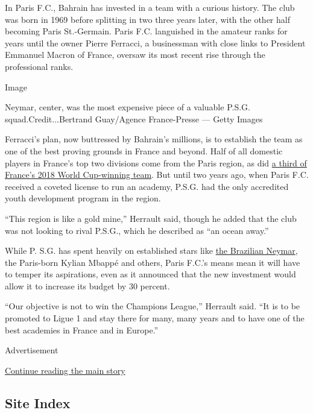 In Paris F.C., Bahrain has invested in a team with a curious history.
The club was born in 1969 before splitting in two three years later,
with the other half becoming Paris St.-Germain. Paris F.C. languished in
the amateur ranks for years until the owner Pierre Ferracci, a
businessman with close links to President Emmanuel Macron of France,
oversaw its most recent rise through the professional ranks.

Image

Neymar, center, was the most expensive piece of a valuable P.S.G.
squad.Credit...Bertrand Guay/Agence France-Presse --- Getty Images

Ferracci's plan, now buttressed by Bahrain's millions, is to establish
the team as one of the best proving grounds in France and beyond. Half
of all domestic players in France's top two divisions come from the
Paris region, as did
\href{https://www.nytimes3xbfgragh.onion/2018/06/07/sports/soccer/france-world-cup-kylian-mbappe.html\#:~:text=Of\%20the\%2023\%20players\%20whom,Presnel\%20Kimpembe\%20and\%20Steven\%20Nzonzi.}{a
third of France's 2018 World Cup-winning team}. But until two years ago,
when Paris F.C. received a coveted license to run an academy, P.S.G. had
the only accredited youth development program in the region.

``This region is like a gold mine,'' Herrault said, though he added that
the club was not looking to rival P.S.G., which he described as ``an
ocean away.''

While P. S.G. has spent heavily on established stars like
\href{https://www.nytimes3xbfgragh.onion/2017/07/26/sports/soccer/at-psg-price-for-neymar-and-elusive-success-might-be-worth-it.html}{the
Brazilian Neymar}, the Paris-born Kylian Mbappé and others, Paris F.C.'s
means mean it will have to temper its aspirations, even as it announced
that the new investment would allow it to increase its budget by 30
percent.

``Our objective is not to win the Champions League,'' Herrault said.
``It is to be promoted to Ligue 1 and stay there for many, many years
and to have one of the best academies in France and in Europe.''

Advertisement

\protect\hyperlink{after-bottom}{Continue reading the main story}

\hypertarget{site-index}{%
\subsection{Site Index}\label{site-index}}

